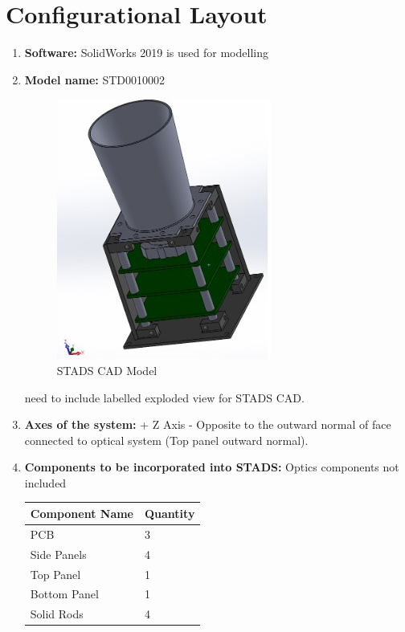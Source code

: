 \documentclass[../../main.tex]{subfiles}
\begin{document}
\section{Configurational Layout}
\begin{enumerate}
    \item \textbf{Software:} SolidWorks 2019 is used for modelling
    \item \textbf{Model name:} STD0010002
    \begin{figure}[H]
        \centering
        \includegraphics{Figures/Mechanical/stads_full.jpg}
        \caption{STADS CAD Model}
        \label{fig:sys_CAD}
    \end{figure}
    \text need to include labelled exploded view for STADS CAD.
    \item \textbf{Axes of the system:} + Z Axis - Opposite to the outward normal of face connected to optical system (Top panel outward normal).
    \item \textbf{Components to be incorporated into STADS:} Optics components not included
    \begin{table}[h!]
        \centering
        \begin{tabular}{| p{5cm} | p{3cm} |}
             \hline
             \textbf{Component Name} & \textbf{Quantity}  \\
             \hline
             PCB & 3 \\
             \hline
             Side Panels & 4 \\
             \hline
             Top Panel & 1 \\
             \hline
             Bottom Panel & 1 \\
             \hline
             Solid Rods & 4 \\

\end{tabular}
\end{table}
\end{enumerate}
\end{document}
